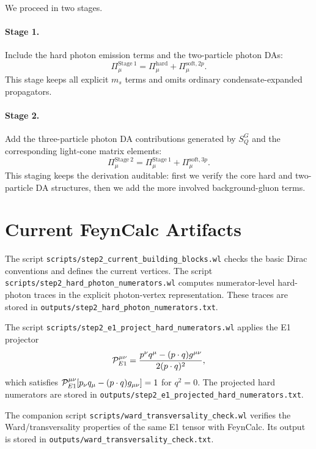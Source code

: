 \documentclass[11pt]{article}
\begin{document}
We proceed in two stages.

\paragraph{Stage 1.}
Include the hard photon emission terms and the two-particle photon DAs:
\begin{equation}
  \Pi_\mu^{\mathrm{Stage\ 1}}
  =
  \Pi_\mu^{\mathrm{hard}}
  +
  \Pi_\mu^{\mathrm{soft},2p}.
\end{equation}
This stage keeps all explicit $m_s$ terms and omits ordinary
condensate-expanded propagators.

\paragraph{Stage 2.}
Add the three-particle photon DA contributions generated by
$S_Q^G$ and the corresponding light-cone matrix elements:
\begin{equation}
  \Pi_\mu^{\mathrm{Stage\ 2}}
  =
  \Pi_\mu^{\mathrm{Stage\ 1}}
  +
  \Pi_\mu^{\mathrm{soft},3p}.
\end{equation}
This staging keeps the derivation auditable: first we verify the core hard and
two-particle DA structures, then we add the more involved background-gluon
terms.

\section{Current FeynCalc Artifacts}

The script \texttt{scripts/step2\_current\_building\_blocks.wl} checks the
basic Dirac conventions and defines the current vertices.  The script
\texttt{scripts/step2\_hard\_photon\_numerators.wl} computes numerator-level
hard-photon traces in the explicit photon-vertex representation.  These traces
are stored in \texttt{outputs/step2\_hard\_photon\_numerators.txt}.

The script \texttt{scripts/step2\_e1\_project\_hard\_numerators.wl} applies the
E1 projector
\begin{equation}
  {\cal P}^{\mu\nu}_{E1}
  =
  \frac{p^\nu q^\mu-(p\cdot q)g^{\mu\nu}}{2(p\cdot q)^2},
\end{equation}
which satisfies ${\cal P}_{E1}^{\mu\nu}
[p_\nu q_\mu-(p\cdot q)g_{\mu\nu}]=1$ for $q^2=0$.  The projected hard
numerators are stored in
\texttt{outputs/step2\_e1\_projected\_hard\_numerators.txt}.

The companion script \texttt{scripts/ward\_transversality\_check.wl} verifies
the Ward/transversality properties of the same E1 tensor with FeynCalc.  Its
output is stored in
\texttt{outputs/ward\_transversality\_check.txt}.
\end{document}
